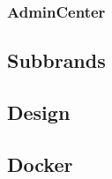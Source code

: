 \subsubsection{AdminCenter} \label{admincenter}


\subsection{Subbrands} \label{subbrands}

\subsection{Design} \label{design}

\subsection{Docker} \label{dockermain}
